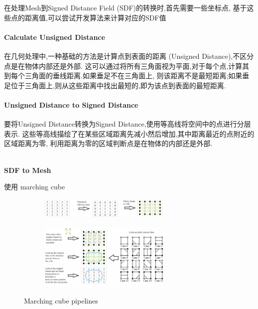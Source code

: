 在处理Mesh到Signed Distance Field (SDF)的转换时,首先需要一些坐标点,
基于这些点的距离值,可以尝试开发算法来计算对应的SDF值

\paragraph{Calculate Unsigned Distance}
在几何处理中,一种基础的方法是计算点到表面的距离 (Unsigned Distance),不区分点是在物体内部还是外部.
这可以通过将所有三角面视为平面,对于每个点,计算其到每个三角面的垂线距离.如果垂足不在三角面上,
则该距离不是最短距离;如果垂足位于三角面上,则从这些距离中找出最短的,即为该点到表面的最短距离.

\paragraph{Unsigned Distance to Signed Distance}
要将Unsigned Distance转换为Signed Distance,使用等高线将空间中的点进行分层表示.
这些等高线描绘了在某些区域距离先减小然后增加,其中距离最近的点附近的区域距离为零,
利用距离为零的区域判断点是在物体的内部还是外部.

\textbf{\\SDF to Mesh}

使用 marching cube

\begin{figure}[H]
    \centering
    \begin{subfigure}
        \centering
        \includegraphics[width=0.7\textwidth]{figures/marching_cube1.png}
    \end{subfigure}
    \vspace{1em} %
    \begin{subfigure}
        \centering
        \includegraphics[width=0.7\textwidth]{figures/marching_cube2.png}
    \end{subfigure}
    \caption{Marching cube pipelines}
    \label{fig:marching_cube}
\end{figure}

